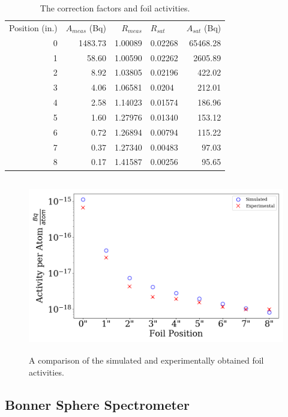 
\begin{table}[h]\centering
\label{tab:a_sat}
\caption{The correction factors and foil activities.}
\begin{tabular}{ r | r | r | l | r }
\toprule
Position (in.)  & $A_{meas}$ (Bq) & $R_{meas}$  & $R_{sat}$   &   $A_{sat}$  (Bq)\\
0 & 1483.73 & 1.00089 & 0.02268 & 65468.28 \\
1 & 58.60 & 1.00590 & 0.02262 &  2605.89  \\
2 & 8.92 & 1.03805 & 0.02196 &   422.02  \\
3 & 4.06 & 1.06581 & 0.0204  &   212.01  \\
4 & 2.58 & 1.14023 & 0.01574  &   186.96  \\
5 & 1.60 & 1.27976 & 0.01340 &      153.12  \\
6 & 0.72 & 1.26894 & 0.00794 &       115.22  \\
7 & 0.37 & 1.27340 & 0.00483 &      97.03   \\
8 & 0.17 & 1.41587 & 0.00256 &       95.65\\
\end{tabular}
\end{table}

\begin{figure}[htb]
\centering
\includegraphics[height=3in]{tex/figures/compare_activities.png}
\caption[Foil Activities]{A comparison of the simulated and experimentally obtained foil activities.}
\label{fig:compare_activities}
\end{figure}


\subsection{Bonner Sphere Spectrometer}

